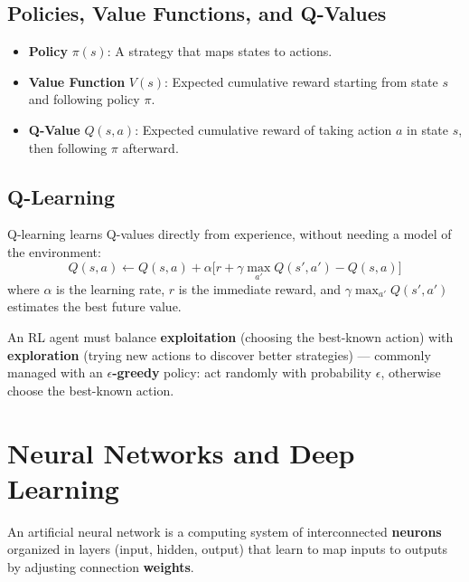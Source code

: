 \documentclass[11pt,a4paper]{article}
\begin{document}
\subsection{Policies, Value Functions, and Q-Values}
\begin{itemize}[leftmargin=*]
  \item \textbf{Policy} $\pi(s)$: A strategy that maps states to actions.
  \item \textbf{Value Function} $V(s)$: Expected cumulative reward starting from state $s$ and following policy $\pi$.
  \item \textbf{Q-Value} $Q(s,a)$: Expected cumulative reward of taking action $a$ in state $s$, then following $\pi$ afterward.
\end{itemize}

\subsection{Q-Learning}
\begin{definitionbox}
Q-learning learns Q-values directly from experience, without needing a model of the environment:
$$
Q(s,a) \leftarrow Q(s,a) + \alpha\Big[r + \gamma \max_{a'} Q(s',a') - Q(s,a)\Big]
$$
where $\alpha$ is the learning rate, $r$ is the immediate reward, and $\gamma \max_{a'} Q(s',a')$ estimates the best future value.
\end{definitionbox}

\begin{conceptbox}
An RL agent must balance \textbf{exploitation} (choosing the best-known action) with \textbf{exploration} (trying new actions to discover better strategies) --- commonly managed with an \textbf{$\epsilon$-greedy} policy: act randomly with probability $\epsilon$, otherwise choose the best-known action.
\end{conceptbox}

\section{Neural Networks and Deep Learning}

\begin{definitionbox}
An artificial neural network is a computing system of interconnected \textbf{neurons} organized in layers (input, hidden, output) that learn to map inputs to outputs by adjusting connection \textbf{weights}.
\end{definitionbox}
\end{document}
